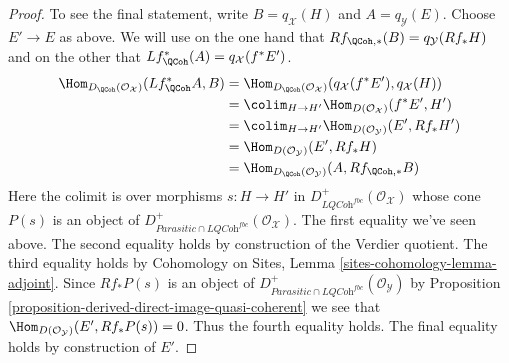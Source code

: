 \begin{proof}
\medskip\noindent
To see the final statement, write $B = q_\mathcal{X}(H)$ and
$A = q_\mathcal{Y}(E)$.
Choose $E' \to E$ as above.
We will use on the one hand that
$Rf_{\QCoh, *}(B) = q_\mathcal{Y}(Rf_*H)$
and on the other that
$Lf^*_\QCoh(A) = q_\mathcal{X}(f^*E')$.
\begin{align*}
\Hom_{D_\QCoh(\mathcal{O}_\mathcal{X})}(Lf^*_\QCoh A, B)
& = 
\Hom_{D_\QCoh(\mathcal{O}_\mathcal{X})}(q_\mathcal{X}(f^*E'),
q_\mathcal{X}(H)) \\
& = 
\colim_{H \to H'} \Hom_{D(\mathcal{O}_\mathcal{X})}(f^*E', H') \\
& = \colim_{H \to H'} \Hom_{D(\mathcal{O}_\mathcal{Y})}(E', Rf_*H') \\
& = \Hom_{D(\mathcal{O}_\mathcal{Y})}(E', Rf_*H) \\
& =
\Hom_{D_\QCoh(\mathcal{O}_\mathcal{Y})}(A, Rf_{\QCoh, *}B)
\end{align*}
Here the colimit is over morphisms $s : H \to H'$ in
$D^+_{\textit{LQCoh}^{fbc}}(\mathcal{O}_\mathcal{X})$
whose cone $P(s)$ is an object of
$D^+_{\textit{Parasitic} \cap \textit{LQCoh}^{fbc}}(\mathcal{O}_\mathcal{X})$.
The first equality we've seen above.
The second equality holds by construction of the Verdier quotient.
The third equality holds by
Cohomology on Sites, Lemma \ref{sites-cohomology-lemma-adjoint}.
Since $Rf_*P(s)$ is an object of
$D^+_{\textit{Parasitic} \cap \textit{LQCoh}^{fbc}}(\mathcal{O}_\mathcal{Y})$
by
Proposition \ref{proposition-derived-direct-image-quasi-coherent}
we see that $\Hom_{D(\mathcal{O}_\mathcal{Y})}(E', Rf_*P(s)) = 0$.
Thus the fourth equality holds. The final equality
holds by construction of $E'$.
\end{proof}














